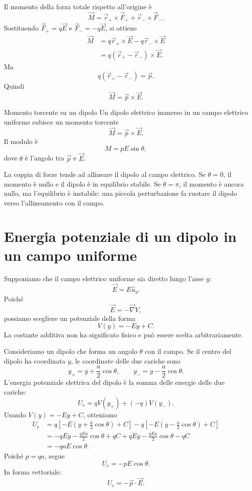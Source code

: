 \documentclass[a4paper]{article}
\begin{document}
Il momento della forza totale rispetto all'origine è
\[
    \vec{M}=\vec{r}_+\times\vec{F}_+ + \vec{r}_-\times\vec{F}_-.
\]
Sostituendo \(\vec{F}_+=q\vec{E}\) e \(\vec{F}_-=-q\vec{E}\), si ottiene
\begin{align*}
    \vec{M}
    &=q\vec{r}_+\times\vec{E}-q\vec{r}_-\times\vec{E} \\
    &=q(\vec{r}_+-\vec{r}_-)\times\vec{E}.
\end{align*}
Ma
\[
    q(\vec{r}_+-\vec{r}_-)=\vec{p}.
\]
Quindi
\[
    \vec{M}=\vec{p}\times\vec{E}.
\]

\begin{snippettheorem}{Momento torcente su un dipolo}
    Un dipolo elettrico immerso in un campo elettrico uniforme subisce un momento torcente
    \[
        \vec{M}=\vec{p}\times\vec{E}.
    \]
    Il modulo è
    \[
        M=pE\sin\theta,
    \]
    dove \(\theta\) è l'angolo tra \(\vec{p}\) e \(\vec{E}\).
\end{snippettheorem}

La coppia di forze tende ad allineare il dipolo al campo elettrico. Se \(\theta=0\), il momento è nullo e il dipolo è in equilibrio stabile. Se \(\theta=\pi\), il momento è ancora nullo, ma l'equilibrio è instabile: una piccola perturbazione fa ruotare il dipolo verso l'allineamento con il campo.

\section{Energia potenziale di un dipolo in un campo uniforme}

Supponiamo che il campo elettrico uniforme sia diretto lungo l'asse \(y\):
\[
    \vec{E}=E\hat{u}_y.
\]
Poiché
\[
    \vec{E}=-\vec{\nabla}V,
\]
possiamo scegliere un potenziale della forma
\[
    V(y)=-Ey+C.
\]
La costante additiva non ha significato fisico e può essere scelta arbitrariamente.

Consideriamo un dipolo che forma un angolo \(\theta\) con il campo. Se il centro del dipolo ha coordinata \(y\), le coordinate delle due cariche sono
\[
    y_+=y+\frac{a}{2}\cos\theta,
    \qquad
    y_-=y-\frac{a}{2}\cos\theta.
\]
L'energia potenziale elettrica del dipolo è la somma delle energie delle due cariche:
\[
    U_e=qV(y_+)+(-q)V(y_-).
\]
Usando \(V(y)=-Ey+C\), otteniamo
\begin{align*}
    U_e
    &=q\left[-E\left(y+\frac{a}{2}\cos\theta\right)+C\right]
    -q\left[-E\left(y-\frac{a}{2}\cos\theta\right)+C\right] \\
    &=-qEy-\frac{qEa}{2}\cos\theta+qC
    +qEy-\frac{qEa}{2}\cos\theta-qC \\
    &=-qaE\cos\theta.
\end{align*}
Poiché \(p=qa\), segue
\[
    U_e=-pE\cos\theta.
\]
In forma vettoriale:
\[
    U_e=-\vec{p}\cdot\vec{E}.
\]
\end{document}
